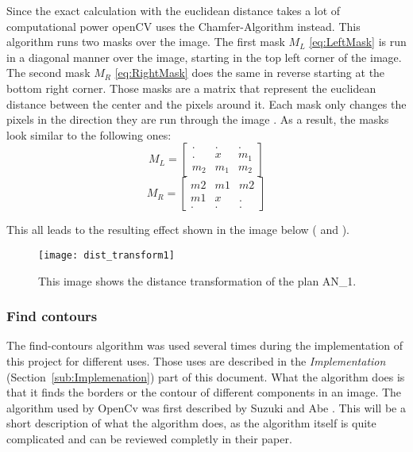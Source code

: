 Since the exact calculation with the euclidean distance takes a lot of computational power openCV uses the Chamfer-Algorithm instead. This algorithm runs two masks over the image. The first mask $M_{L}$ \eqref{eq:LeftMask} is run in a diagonal manner over the image, starting in the top left corner of the image. The second mask $M_{R}$ \eqref{eq:RightMask} does the same in reverse starting at the bottom right corner. Those masks are a matrix that represent the euclidean distance between the center and the pixels around it. Each mask only changes the pixels in the direction they are run through the image \citep{burger_burge_2016}. As a result, the masks look similar to the following ones:
\begin{equation}\label{eq:LeftMask} M_{L} = \begin{bmatrix} . & . & .\\ . & x & m_1 \\ m_2 & m_1 & m_2 \end{bmatrix}\end{equation}
\begin{equation}\label{eq:RightMask}M_{R} = \begin{bmatrix} m2 & m1 & m2 \\ m1 & x & . \\ . & . & . \end{bmatrix} \end{equation}

This all leads to the resulting effect shown in the image below (\citep{szeliski_2011} and \citep{distancetransform}).
\begin{figure}[h]
	\centering
	\texttt{[image: dist\_transform1]}
	\caption{This image shows the distance transformation of the plan AN\_1.}
	\label{dist_transf_theory}
\end{figure}


\subsubsection{Find contours}
\label{sub:FindContoursTheory}
The find-contours algorithm was used several times during the implementation of this project for different uses. Those uses are described in the \textit{Implementation} (Section~\ref{sub:Implemenation}) part of this document. What the algorithm does is that it finds the borders or the contour of different components in an image. The algorithm used by OpenCv was first described by Suzuki and Abe \citep{suzuki_abe_1985}. This will be a short description of what the algorithm does, as the algorithm itself is quite complicated and can be reviewed completly in their paper.

